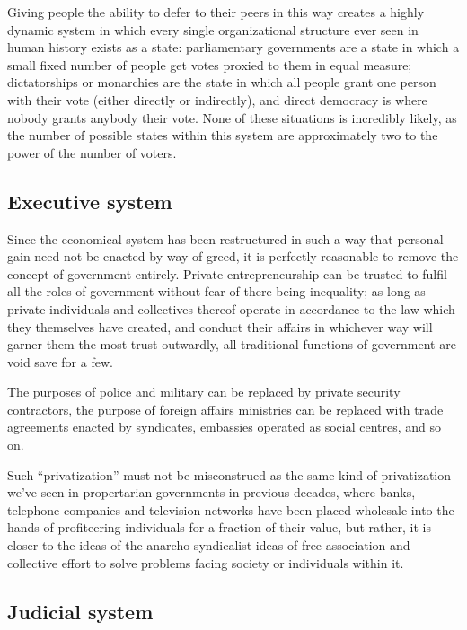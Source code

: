 Giving people the ability to defer to their peers in this way creates a highly
dynamic system in which every single organizational structure ever seen in 
human history exists as a state: parliamentary governments are a state in which
a small f\hbox{}ixed number of people get votes proxied to them in equal
measure; dictatorships or monarchies are the state in which all people grant 
one person with their vote (either directly or indirectly), and direct 
democracy is where nobody grants anybody their vote. None of these situations 
is incredibly likely, as the number of possible states within this system are
approximately two to the power of the number of voters.


\subsection{Executive system}
\label{s:artificial_scarcity:five_steps:executive_system}

Since the economical system has been restructured in such a way that personal
gain need not be enacted by way of greed, it is perfectly reasonable to remove
the concept of government entirely. Private entrepreneurship can be trusted to
fulf\hbox{}il all the roles of government without fear of there being
inequality; as long as private individuals and collectives thereof operate in
accordance to the law which they themselves have created, and conduct their
af\hbox{}fairs in whichever way will garner them the most trust outwardly, all
traditional functions of government are void save for a few.

The purposes of police and military can be replaced by private security
contractors, the purpose of foreign af\hbox{}fairs ministries can be replaced
with trade agreements enacted by syndicates, embassies operated as social
centres, and so on. 

Such ``privatization'' must not be misconstrued as the same kind of
privatization we've seen in propertarian governments in previous decades, where
banks, telephone companies and television networks have been placed wholesale
into the hands of prof\hbox{}iteering individuals for a fraction of their 
value, but rather, it is closer to the ideas of the anarcho-syndicalist ideas 
of free association and collective ef\hbox{}fort to solve problems facing
society or individuals within it. 


\subsection{Judicial system}
\label{s:artificial_scarcity:five_steps:judicial_system}

